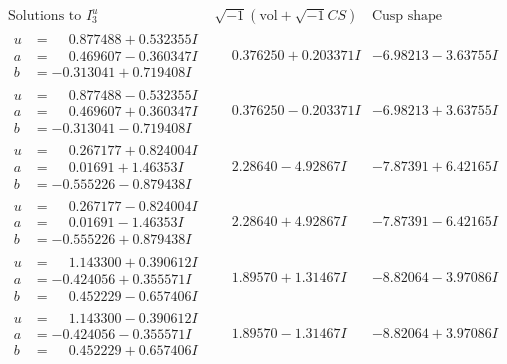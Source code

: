 \documentclass[1p]{elsarticle_modified}
\theoremstyle{definition}
\newcommand{\I}{\sqrt{-1}}
\begin{document}
$$\begin{array}{c|c|c}  
\text{Solutions to }I^u_{3}& \I (\text{vol} + \sqrt{-1}CS) & \text{Cusp shape}\\
 \hline 
\begin{aligned}
u &= \phantom{-}0.877488 + 0.532355 I \\
a &= \phantom{-}0.469607 - 0.360347 I \\
b &= -0.313041 + 0.719408 I\end{aligned}
 & \phantom{-}0.376250 + 0.203371 I & -6.98213 - 3.63755 I \\ \hline\begin{aligned}
u &= \phantom{-}0.877488 - 0.532355 I \\
a &= \phantom{-}0.469607 + 0.360347 I \\
b &= -0.313041 - 0.719408 I\end{aligned}
 & \phantom{-}0.376250 - 0.203371 I & -6.98213 + 3.63755 I \\ \hline\begin{aligned}
u &= \phantom{-}0.267177 + 0.824004 I \\
a &= \phantom{-}0.01691 + 1.46353 I \\
b &= -0.555226 - 0.879438 I\end{aligned}
 & \phantom{-}2.28640 - 4.92867 I & -7.87391 + 6.42165 I \\ \hline\begin{aligned}
u &= \phantom{-}0.267177 - 0.824004 I \\
a &= \phantom{-}0.01691 - 1.46353 I \\
b &= -0.555226 + 0.879438 I\end{aligned}
 & \phantom{-}2.28640 + 4.92867 I & -7.87391 - 6.42165 I \\ \hline\begin{aligned}
u &= \phantom{-}1.143300 + 0.390612 I \\
a &= -0.424056 + 0.355571 I \\
b &= \phantom{-}0.452229 - 0.657406 I\end{aligned}
 & \phantom{-}1.89570 + 1.31467 I & -8.82064 - 3.97086 I \\ \hline\begin{aligned}
u &= \phantom{-}1.143300 - 0.390612 I \\
a &= -0.424056 - 0.355571 I \\
b &= \phantom{-}0.452229 + 0.657406 I\end{aligned}
 & \phantom{-}1.89570 - 1.31467 I & -8.82064 + 3.97086 I \\ \hline\begin{aligned}

\end{aligned}
\end{array}$$
\end{document}
